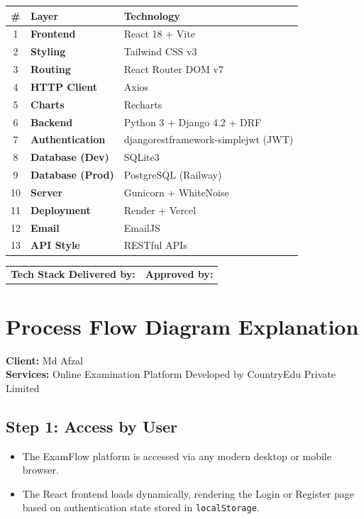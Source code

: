 \documentclass[12pt,a4paper]{article}
\begin{document}
\begin{center}
\begin{tabular}{c >{\bfseries}l l}
  \toprule
  \# & Layer & Technology \\
  \midrule
  1 & Frontend       & React 18 + Vite \\
  2 & Styling        & Tailwind CSS v3 \\
  3 & Routing        & React Router DOM v7 \\
  4 & HTTP Client    & Axios \\
  5 & Charts         & Recharts \\
  6 & Backend        & Python 3 + Django 4.2 + DRF \\
  7 & Authentication & djangorestframework-simplejwt (JWT) \\
  8 & Database (Dev) & SQLite3 \\
  9 & Database (Prod)& PostgreSQL (Railway) \\
  10 & Server        & Gunicorn + WhiteNoise \\
  11 & Deployment    & Render + Vercel \\
  12 & Email         & EmailJS \\
  13 & API Style     & RESTful APIs \\
  \bottomrule
\end{tabular}
\end{center}

\vspace{1.5cm}
\noindent\begin{tabular}{p{7cm} p{7cm}}
  \textbf{Tech Stack Delivered by:} \hrulefill & \textbf{Approved by:} \hrulefill \\
\end{tabular}

\newpage


\section{Process Flow Diagram Explanation}

\textbf{Client:} Md Afzal\\
\textbf{Services:} Online Examination Platform Developed by CountryEdu Private Limited

\subsection*{Step 1: Access by User}
\begin{itemize}[leftmargin=1.5em]
  \item[(a)] The ExamFlow platform is accessed via any modern desktop or mobile browser.
  \item[(b)] The React frontend loads dynamically, rendering the Login or Register page based on authentication state stored in \texttt{localStorage}.
\end{itemize}
\end{document}
